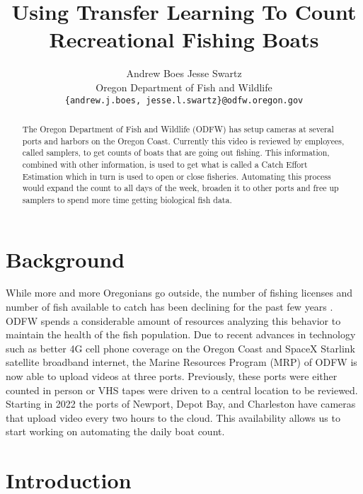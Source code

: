 \documentclass[10pt,twocolumn,letterpaper]{article}
\begin{document}
\title{ Using Transfer Learning To Count Recreational Fishing Boats }

\author{Andrew Boes \hspace{30pt} Jesse Swartz \\
Oregon Department of Fish and Wildlife\\
{\tt\small \{andrew.j.boes, jesse.l.swartz\}@odfw.oregon.gov}
}
\maketitle

\begin{abstract}
   The Oregon Department of Fish and Wildlife (ODFW) has setup cameras at several ports and harbors on the Oregon Coast. Currently this video is reviewed by employees, called samplers, to get counts of boats that are going out fishing. This information, combined with other information, is used to get what is called a Catch Effort Estimation which in turn is used to open or close fisheries. Automating this process would expand the count to all days of the week, broaden it to other ports and free up samplers to spend more time getting biological fish data.
\end{abstract}

\section{Background}

While more and more Oregonians go outside, the number of fishing licenses and number of fish available to catch has been declining for the past few years \cite{ODFW_Annual}. ODFW spends a considerable amount of resources analyzing this behavior to maintain the health of the fish population. Due to recent advances in technology such as better 4G cell phone coverage on the Oregon Coast and SpaceX Starlink satellite broadband internet, the Marine Resources Program (MRP) of ODFW is now able to upload videos at three ports. Previously, these ports were either counted in person or VHS tapes were driven to a central location to be reviewed. Starting in 2022 the ports of Newport, Depot Bay, and Charleston have cameras that upload video every two hours to the cloud. This availability allows us to start working on automating the daily boat count.\\[-5pt]

\section{Introduction}
\end{document}

